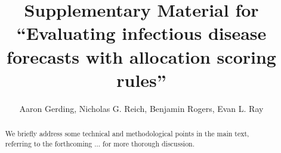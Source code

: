 \documentclass{article}\usepackage[]{graphicx}\usepackage[]{xcolor}
\title{Supplementary Material for ``Evaluating infectious disease forecasts with allocation scoring rules''}
\author{Aaron Gerding, Nicholas G. Reich, Benjamin Rogers, Evan L. Ray}
\begin{document}
\newcommand{\del}[2]{\frac{\partial {#1} }{\partial {#2}} }
\newcommand{\dby}[2]{\frac{d {#1} }{d {#2}} }
\newcommand{\sbar}{\overline{s}}

\newtheorem{proposition}{Proposition}

\theoremstyle{remark}
\newtheorem*{remark}{Remark}

\maketitle







\begin{abstract}
We briefly address some technical and methodological points in the main text, referring to the forthcoming ... for 
more thorough discussion.
\end{abstract}
\end{document}
